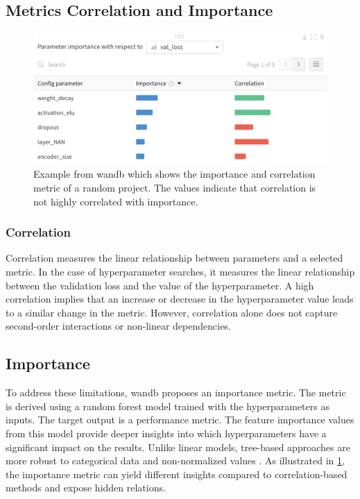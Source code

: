 \subsection{Metrics Correlation and Importance}

\begin{figure}
    \centering
    \includegraphics[width=0.5\linewidth]{figures/image.png}
    \caption{Example from \acrshort{wandb}\cite{wandb_parameter_importance} which shows the importance and correlation metric of a random project. The values indicate that correlation is not highly correlated with importance.}
    \label{fig:importance_v_correlation}
\end{figure}

\subsubsection{Correlation}

Correlation measures the linear relationship between parameters and a selected metric. In the case of hyperparameter searches, it measures the linear relationship between the validation loss and the value of the hyperparameter. A high correlation implies that an increase or decrease in the hyperparameter value leads to a similar change in the metric. However, correlation alone does not capture second-order interactions or non-linear dependencies.

\subsection{Importance}

To address these limitations, \acrfull{wandb} proposes an importance metric. The metric is derived using a random forest model trained with the hyperparameters as inputs. The target output is a performance metric. The feature importance values from this model provide deeper insights into which hyperparameters have a significant impact on the results. Unlike linear models, tree-based approaches are more robust to categorical data and non-normalized values \cite{wandb_parameter_importance}. As illustrated in \cref{fig:importance_v_correlation}, the importance metric can yield different insights compared to correlation-based methods and expose hidden relations.

